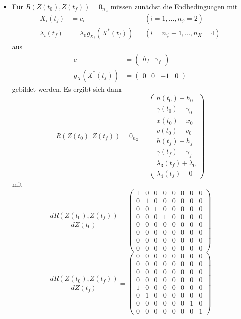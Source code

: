 \begin{itemize}
%
\item Für $R(Z(t_0),Z(t_f)) = 0_{n_Z}$ müssen zunächst die Endbedingungen mit
\begin{align*}
X_i(t_f) &= c_i & & (i=1,...,n_{\psi}=2) \\
\lambda_i(t_f) &= \lambda_0 g_{X_i}(X^{\ast}(t_f)) & &(i=n_{\psi}+1,...,n_X=4)
\end{align*}
aus
\begin{align*}
c &= \begin{pmatrix} h_f & \gamma_f \end{pmatrix} \\
g_{X}(X^{\ast}(t_f)) &= \begin{pmatrix} 0 & 0 & -1 & 0 \end{pmatrix}
\end{align*}
gebildet werden. Es ergibt sich dann
\begin{equation}
R(Z(t_0),Z(t_f)) = 0_{n_Z} = \begin{pmatrix}
h(t_0) - h_0 \\ 
\gamma(t_0) - \gamma_0 \\
x(t_0) - x_0 \\ 
v(t_0) - v_0 \\ 
h(t_f) - h_f \\ 
\gamma(t_f) - \gamma_f \\
\lambda_3(t_f) + \lambda_0 \\ 
\lambda_4(t_f) - 0
\end{pmatrix}
\end{equation}
mit 
\begin{equation}
\dfrac{d R(Z(t_0),Z(t_f))}{d Z(t_0)} = \begin{pmatrix}
1 & 0 & 0 & 0 & 0 & 0 & 0 & 0 \\ 
0 & 1 & 0 & 0 & 0 & 0 & 0 & 0 \\ 
0 & 0 & 1 & 0 & 0 & 0 & 0 & 0 \\ 
0 & 0 & 0 & 1 & 0 & 0 & 0 & 0 \\
0 & 0 & 0 & 0 & 0 & 0 & 0 & 0 \\
0 & 0 & 0 & 0 & 0 & 0 & 0 & 0 \\
0 & 0 & 0 & 0 & 0 & 0 & 0 & 0 \\
0 & 0 & 0 & 0 & 0 & 0 & 0 & 0
\end{pmatrix}
\end{equation}
\begin{equation}
\dfrac{d R(Z(t_0),Z(t_f))}{d Z(t_f)} = \begin{pmatrix}
0 & 0 & 0 & 0 & 0 & 0 & 0 & 0 \\ 
0 & 0 & 0 & 0 & 0 & 0 & 0 & 0 \\ 
0 & 0 & 0 & 0 & 0 & 0 & 0 & 0 \\ 
0 & 0 & 0 & 0 & 0 & 0 & 0 & 0 \\
1 & 0 & 0 & 0 & 0 & 0 & 0 & 0 \\
0 & 1 & 0 & 0 & 0 & 0 & 0 & 0 \\
0 & 0 & 0 & 0 & 0 & 0 & 1 & 0 \\
0 & 0 & 0 & 0 & 0 & 0 & 0 & 1
\end{pmatrix}
\end{equation}
\end{itemize}
